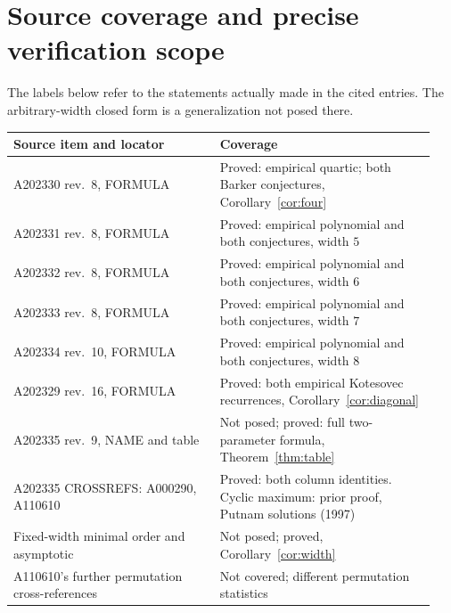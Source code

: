 \documentclass[11pt]{article}
\begin{document}
\section{Source coverage and precise verification scope}
The labels below refer to the statements actually made in the cited entries. The arbitrary-width closed form is a generalization not posed there.
\begin{center}\small
\begin{tabular}{@{}p{0.46\linewidth}p{0.48\linewidth}@{}}
\toprule
Source item and locator & Coverage\\
\midrule
A202330 rev.\ 8, FORMULA & Proved: empirical quartic; both Barker conjectures, Corollary~\ref{cor:four}\\
A202331 rev.\ 8, FORMULA & Proved: empirical polynomial and both conjectures, width $5$\\
A202332 rev.\ 8, FORMULA & Proved: empirical polynomial and both conjectures, width $6$\\
A202333 rev.\ 8, FORMULA & Proved: empirical polynomial and both conjectures, width $7$\\
A202334 rev.\ 10, FORMULA & Proved: empirical polynomial and both conjectures, width $8$\\
A202329 rev.\ 16, FORMULA & Proved: both empirical Kotesovec recurrences, Corollary~\ref{cor:diagonal}\\
A202335 rev.\ 9, NAME and table & Not posed; proved: full two-parameter formula, Theorem~\ref{thm:table}\\
A202335 CROSSREFS: A000290, A110610 & Proved: both column identities. Cyclic maximum: prior proof, Putnam solutions (1997)\\
Fixed-width minimal order and asymptotic & Not posed; proved, Corollary~\ref{cor:width}\\
A110610's further permutation cross-references & Not covered; different permutation statistics\\
\bottomrule
\end{tabular}
\end{center}
\end{document}
